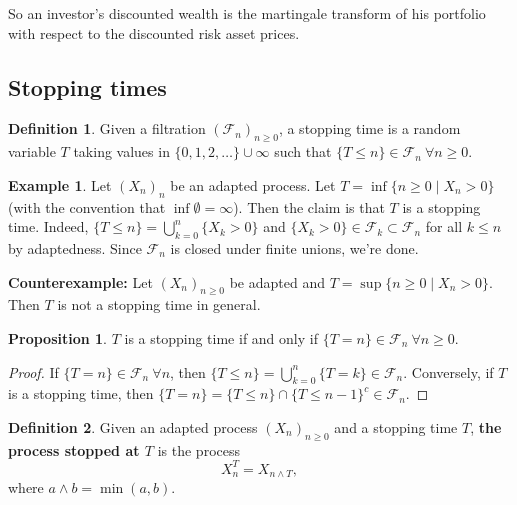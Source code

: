 \documentclass{article}
\theoremstyle{definition}
\newtheorem{prop}[theorem]{Proposition}
\newtheorem{example}{Example}[section]
\newtheorem{defn}{Definition}[section]
\begin{document}
So an investor's discounted wealth is the martingale transform of his portfolio with respect to the discounted risk asset prices.


\subsection{Stopping times}
\begin{defn}
    Given a filtration $(\mathcal{F}_n)_{n\ge 0}$, a stopping time is a random variable $T$ taking values in $\{0,1,2,\ldots\} \cup \infty$ such that $\{T\le n\} \in \mathcal{F}_n ~\forall n\ge 0$. 
\end{defn}
\begin{example}
    Let $(X_n)_n$ be an adapted process. Let $T = \inf \{n\ge 0 \mid X_n>0\}$ (with the convention that $\inf \emptyset = \infty$). Then the claim is that $T$ is a stopping time. Indeed, $\{T \le n\} = \bigcup_{k=0}^n \{X_k > 0\}$ and $\{X_k >0\} \in \mathcal{F}_k \subset \mathcal{F}_n$ for all $k\le n$ by adaptedness. Since $\mathcal{F}_n$ is closed under finite unions, we're done.
\end{example}

\textbf{Counterexample:} Let $(X_n)_{n\ge 0}$ be adapted and $T = \sup \{ n\ge 0 \mid X_n>0\}$. Then $T$ is not a stopping time in general.

\begin{prop}
    $T$ is a stopping time if and only if $\{T=n\} \in \mathcal{F}_n ~\forall n\ge 0$.
\end{prop}
\begin{proof}
    If $\{T=n\} \in \mathcal{F}_n ~\forall n$, then $\{T\le n\} = \bigcup_{k=0}^n \{T=k\} \in \mathcal{F}_n$. Conversely, if $T$ is a stopping time, then $\{T=n\} = \{T\le n\} \cap \{T\le n-1\}^{c} \in \mathcal{F}_n$.
\end{proof}

\begin{defn}
    Given an adapted process $(X_n)_{n\ge 0}$ and a stopping time $T$, \textbf{the process stopped at $T$} is the process \[
    X_n^T = X_{n \wedge T},
    \] 
    where $a \wedge b = \min(a,b)$.
\end{defn}
\end{document}

